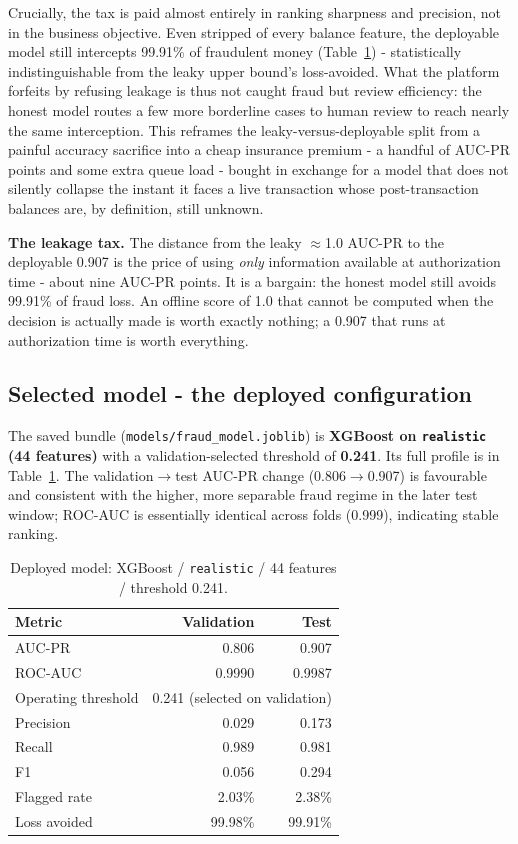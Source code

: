 \documentclass[11pt,a4paper]{report}
\newcommand{\code}[1]{\texttt{\small #1}}
\begin{document}
Crucially, the tax is paid almost entirely in ranking sharpness and precision, not in the business objective. Even stripped of every balance feature, the deployable model still intercepts 99.91\% of fraudulent money (Table~\ref{tab:deployed}) - statistically indistinguishable from the leaky upper bound's loss-avoided. What the platform forfeits by refusing leakage is thus not caught fraud but review efficiency: the honest model routes a few more borderline cases to human review to reach nearly the same interception. This reframes the leaky-versus-deployable split from a painful accuracy sacrifice into a cheap insurance premium - a handful of AUC-PR points and some extra queue load - bought in exchange for a model that does not silently collapse the instant it faces a live transaction whose post-transaction balances are, by definition, still unknown.

\begin{keybox}
\textbf{The leakage tax.} The distance from the leaky $\approx$1.0 AUC-PR to the deployable 0.907 is the price of using \emph{only} information available at authorization time - about nine AUC-PR points. It is a bargain: the honest model still avoids 99.91\% of fraud loss. An offline score of 1.0 that cannot be computed when the decision is actually made is worth exactly nothing; a 0.907 that runs at authorization time is worth everything.
\end{keybox}

\subsection{Selected model - the deployed configuration}

The saved bundle (\code{models/fraud\_model.joblib}) is \textbf{XGBoost on \code{realistic}
(44 features)} with a validation-selected threshold of \textbf{0.241}. Its full profile is
in Table~\ref{tab:deployed}. The validation$\to$test AUC-PR change (0.806$\to$0.907) is
favourable and consistent with the higher, more separable fraud regime in the later test
window; ROC-AUC is essentially identical across folds (0.999), indicating stable ranking.

\begin{table}[h]
\centering
\small
\begin{tabular}{@{}l rr@{}}
\toprule
\textbf{Metric} & \textbf{Validation} & \textbf{Test}\\
\midrule
AUC-PR & 0.806 & 0.907\\
ROC-AUC & 0.9990 & 0.9987\\
Operating threshold & \multicolumn{2}{c}{0.241 (selected on validation)}\\
Precision & 0.029 & 0.173\\
Recall & 0.989 & 0.981\\
F1 & 0.056 & 0.294\\
Flagged rate & 2.03\% & 2.38\%\\
Loss avoided & 99.98\% & 99.91\%\\
\bottomrule
\end{tabular}
\caption{Deployed model: XGBoost / \code{realistic} / 44 features / threshold 0.241.}
\label{tab:deployed}
\end{table}
\end{document}
